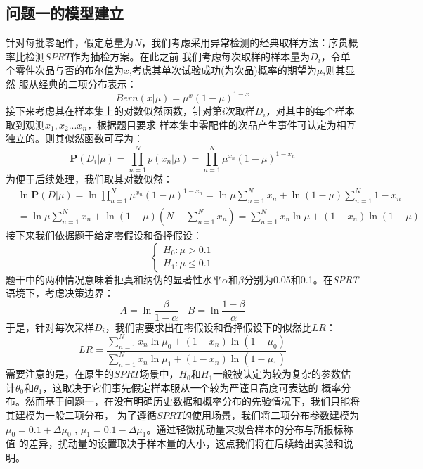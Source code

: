 \documentclass[withoutpreface,bwprint]{cumcmthesis} %
\begin{document}
\subsection{问题一的模型建立}
针对每批零配件，假定总量为$N$，我们考虑采用异常检测的经典取样方法：序贯概率比检测$SPRT$作为抽检方案。在此之前
我们考虑每次取样的样本量为$D_i$，令单个零件次品与否的布尔值为$x$,考虑其单次试验成功(为次品)概率的期望为$\mu$,则其显然
服从经典的二项分布表示：
\begin{equation}
	\textit{Bern}(x|\mu) = \mu^x (1 - \mu)^{1-x}
\end{equation}
接下来考虑其在样本集上的对数似然函数，针对第$i$次取样$D_i$，对其中的每个样本取到观测$x_1,x_2...x_n$，根据题目要求
样本集中零配件的次品产生事件可认定为相互独立的。则其似然函数可写为：
\begin{equation}
	\mathbf{P}(D_i|\mu) = \prod_{n=1}^{N} p(x_n|\mu) = \prod_{n=1}^{N} \mu^{x_n} (1 - \mu)^{1-x_n}
\end{equation}
为便于后续处理，我们取其对数似然：
\begin{equation}
	\begin{split}
		&\ln\mathbf{P}(D|\mu) = \ln \prod_{n=1}^{N} \mu^{x_n} (1 - \mu)^{1-x_n}
		= \ln \mu \sum_{n=1}^{N} x_n + \ln(1 - \mu) \sum_{n=1}^{N} 1 - x_n \\
		&=  \ln \mu \sum_{n=1}^{N} x_n + \ln(1 - \mu) (N - \sum_{n=1}^{N} x_n)
		= \sum_{n=1}^{N} x_n \ln \mu + (1 - x_n) \ln(1 - \mu)
	\end{split}
\end{equation}
接下来我们依据题干给定零假设和备择假设：
\begin{equation}
	\begin{cases}
		H_0: \mu > 0.1 \\
		H_1: \mu \le 0.1
	\end{cases}
\end{equation}
题干中的两种情况意味着拒真和纳伪的显著性水平$\alpha$和$\beta$分别为0.05和0.1。在\textit{SPRT}语境下，考虑决策边界：
$$ A = \ln \frac{\beta}{1 - \alpha} \ \ \ \  B = \ln \frac{1 - \beta}{\alpha}$$
于是，针对每次采样$D_i$，我们需要求出在零假设和备择假设下的似然比$LR$：
\begin{equation}
	LR= \frac{\sum_{n=1}^{N} x_n \ln \mu_0 + (1 - x_n) \ln(1 - \mu_0)}{\sum_{n=1}^{N} x_n \ln \mu_1 + (1 - x_n) \ln(1 - \mu_1)}
\end{equation}
需要注意的是，在原生的$SPRT$场景中，$H_0$和$H_1$一般被认定为较为复杂的参数估计$\theta_0$和$\theta_1$，这取决于它们事先假定样本服从一个较为严谨且高度可表达的
概率分布。然而基于问题一，在没有明确历史数据和概率分布的先验情况下，我们只能将其建模为一般二项分布，
为了遵循$SPRT$的使用场景，我们将二项分布参数建模为$\mu_0=0.1+\Delta \mu_0$ , $\mu_1=0.1-\Delta \mu_1$。通过轻微扰动量来拟合样本的分布与所报标称值
的差异，扰动量的设置取决于样本量的大小，这点我们将在后续给出实验和说明。
\end{document}
